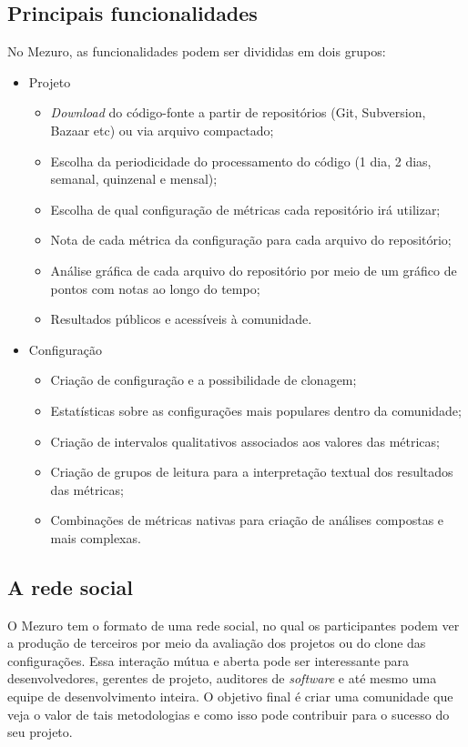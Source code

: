 \documentclass[12pt]{article}
\begin{document}
  \subsection{Principais funcionalidades}\label{sec:princ-funcionalidades}
  No Mezuro, as funcionalidades podem ser divididas em dois grupos:
  \begin{itemize}
    \item Projeto
      \begin{itemize}
      \item \textit{Download} do código-fonte a partir de repositórios (Git, Subversion, Bazaar etc) ou via arquivo compactado;
          \item Escolha da periodicidade do processamento do código (1 dia, 2 dias, semanal, quinzenal e mensal);
          \item Escolha de qual configuração de métricas cada repositório irá utilizar;
          \item Nota de cada métrica da configuração para cada arquivo do repositório;
          \item Análise gráfica de cada arquivo do repositório por meio de um gráfico de pontos com notas ao longo do tempo;
          \item Resultados públicos e acessíveis à comunidade.
      \end{itemize}
      \item Configuração
      \begin{itemize}
      \item Criação de configuração e a possibilidade de clonagem;
          \item Estatísticas sobre as configurações mais populares dentro da comunidade;
          \item Criação de intervalos qualitativos associados aos valores das métricas;
          \item Criação de grupos de leitura para a interpretação textual dos resultados das métricas;
          \item Combinações de métricas nativas para criação de análises compostas e mais complexas.
      \end{itemize}
  \end{itemize}

  \subsection{A rede social}\label{sec:user-potencial}
  O Mezuro tem o formato de uma rede social, no qual os participantes podem ver a produção de terceiros por meio da avaliação dos projetos ou do clone das configurações. Essa interação mútua e aberta pode ser interessante para desenvolvedores, gerentes de projeto, auditores de \textit{software} e até mesmo uma equipe de desenvolvimento inteira. O objetivo final é criar uma comunidade que veja o valor de tais metodologias e como isso pode contribuir para o sucesso do seu projeto.
\end{document}
